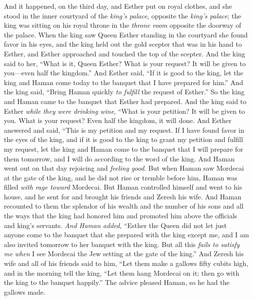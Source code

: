 \begin{biblechapter} %
 And it happened, on the third day, and Esther put on royal clothes, and she stood in the inner courtyard of the \textit{king’s palace}, opposite the \textit{king’s palace}; the king was sitting on his royal throne in the \textit{throne room} opposite the doorway of the palace.
\verse When the king saw Queen Esther standing in the courtyard she found favor in his eyes, and the king held out the gold scepter that was in his hand to Esther, and Esther approached and touched the top of the scepter.
\verse And the king said to her, “What is it, Queen Esther? What is your request? It will be given to you—even half the kingdom.”
\verse And Esther said, “If it is good to the king, let the king and Haman come today to the banquet that I have prepared for him.”
\verse And the king said, “Bring Haman quickly \textit{to fulfill} the request of Esther.” So the king and Haman came to the banquet that Esther had prepared.
\verse And the king said to Esther \textit{while they were drinking wine}, “What is your petition? It will be given to you. What is your request? Even half the kingdom, it will done.
\verse And Esther answered and said, “This is my petition and my request.
\verse If I have found favor in the eyes of the king, and if it is good to the king to grant my petition and fulfill my request, let the king and Haman come to the banquet that I will prepare for them tomorrow, and I will do according to the word of the king.
\verse And Haman went out on that day rejoicing and \textit{feeling good}. But when Haman saw Mordecai at the gate of the king, and he did not rise or tremble before him, Haman was filled \textit{with rage toward} Mordecai.
\verse But Haman controlled himself and went to his house, and he sent for and brought his friends and Zeresh his wife.
\verse And Haman recounted to them the splendor of his wealth and the number of his sons and all the ways that the king had honored him and promoted him above the officials and king’s servants.
\verse \textit{And Haman added}, “Esther the Queen did not let just anyone come to the banquet that she prepared with the king except me, and I am also invited tomorrow to her banquet with the king.
\verse But all this \textit{fails to satisfy me} \textit{when} I see Mordecai the Jew setting at the gate of the king.”
\verse And Zeresh his wife and all of his friends said to him, “Let them make a gallows fifty cubits high, and in the morning tell the king, “Let them hang Mordecai on it; then go with the king to the banquet happily.” The advice pleased Haman, so he had the gallows made.
\end{biblechapter}

